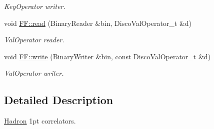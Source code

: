 \begin{DoxyCompactItemize}
\begin{DoxyCompactList}\small\item\em Key\+Operator writer. \end{DoxyCompactList}\item 
void \mbox{\hyperlink{namespaceFF_adbbf0211a7578841555412497b4f18c4}{F\+F\+::read}} (Binary\+Reader \&bin, Disco\+Val\+Operator\+\_\+t \&d)
\begin{DoxyCompactList}\small\item\em Val\+Operator reader. \end{DoxyCompactList}\item 
void \mbox{\hyperlink{namespaceFF_a6906b2ce111930a390f4a8e81b1730b6}{F\+F\+::write}} (Binary\+Writer \&bin, const Disco\+Val\+Operator\+\_\+t \&d)
\begin{DoxyCompactList}\small\item\em Val\+Operator writer. \end{DoxyCompactList}\end{DoxyCompactItemize}


\subsection{Detailed Description}
\mbox{\hyperlink{namespaceHadron}{Hadron}} 1pt correlators. 

